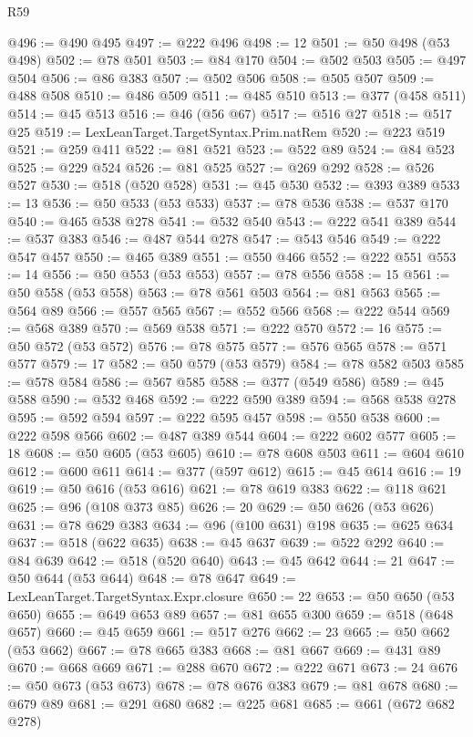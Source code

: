 \begin{lexlean}{R59}
\begin{coremodule}
@496 := @490 @495
@497 := @222 @496
@498 := 12
@501 := @50 @498 (@53 @498)
@502 := @78 @501
@503 := @84 @170
@504 := @502 @503
@505 := @497 @504
@506 := @86 @383
@507 := @502 @506
@508 := @505 @507
@509 := @488 @508
@510 := @486 @509
@511 := @485 @510
@513 := @377 (@458 @511)
@514 := @45 @513
@516 := @46 (@56 @67)
@517 := @516 @27
@518 := @517 @25
@519 := LexLeanTarget.TargetSyntax.Prim.natRem
@520 := @223 @519
@521 := @259 @411
@522 := @81 @521
@523 := @522 @89
@524 := @84 @523
@525 := @229 @524
@526 := @81 @525
@527 := @269 @292
@528 := @526 @527
@530 := @518 (@520 @528)
@531 := @45 @530
@532 := @393 @389
@533 := 13
@536 := @50 @533 (@53 @533)
@537 := @78 @536
@538 := @537 @170
@540 := @465 @538 @278
@541 := @532 @540
@543 := @222 @541 @389
@544 := @537 @383
@546 := @487 @544 @278
@547 := @543 @546
@549 := @222 @547 @457
@550 := @465 @389
@551 := @550 @466
@552 := @222 @551
@553 := 14
@556 := @50 @553 (@53 @553)
@557 := @78 @556
@558 := 15
@561 := @50 @558 (@53 @558)
@563 := @78 @561 @503
@564 := @81 @563
@565 := @564 @89
@566 := @557 @565
@567 := @552 @566
@568 := @222 @544
@569 := @568 @389
@570 := @569 @538
@571 := @222 @570
@572 := 16
@575 := @50 @572 (@53 @572)
@576 := @78 @575
@577 := @576 @565
@578 := @571 @577
@579 := 17
@582 := @50 @579 (@53 @579)
@584 := @78 @582 @503
@585 := @578 @584
@586 := @567 @585
@588 := @377 (@549 @586)
@589 := @45 @588
@590 := @532 @468
@592 := @222 @590 @389
@594 := @568 @538 @278
@595 := @592 @594
@597 := @222 @595 @457
@598 := @550 @538
@600 := @222 @598 @566
@602 := @487 @389 @544
@604 := @222 @602 @577
@605 := 18
@608 := @50 @605 (@53 @605)
@610 := @78 @608 @503
@611 := @604 @610
@612 := @600 @611
@614 := @377 (@597 @612)
@615 := @45 @614
@616 := 19
@619 := @50 @616 (@53 @616)
@621 := @78 @619 @383
@622 := @118 @621
@625 := @96 (@108 @373 @85)
@626 := 20
@629 := @50 @626 (@53 @626)
@631 := @78 @629 @383
@634 := @96 (@100 @631) @198
@635 := @625 @634
@637 := @518 (@622 @635)
@638 := @45 @637
@639 := @522 @292
@640 := @84 @639
@642 := @518 (@520 @640)
@643 := @45 @642
@644 := 21
@647 := @50 @644 (@53 @644)
@648 := @78 @647
@649 := LexLeanTarget.TargetSyntax.Expr.closure
@650 := 22
@653 := @50 @650 (@53 @650)
@655 := @649 @653 @89
@657 := @81 @655 @300
@659 := @518 (@648 @657)
@660 := @45 @659
@661 := @517 @276
@662 := 23
@665 := @50 @662 (@53 @662)
@667 := @78 @665 @383
@668 := @81 @667
@669 := @431 @89
@670 := @668 @669
@671 := @288 @670
@672 := @222 @671
@673 := 24
@676 := @50 @673 (@53 @673)
@678 := @78 @676 @383
@679 := @81 @678
@680 := @679 @89
@681 := @291 @680
@682 := @225 @681
@685 := @661 (@672 @682 @278)

\end{coremodule}
\end{lexlean}
